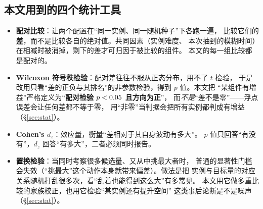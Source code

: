 \documentclass[UTF8, a4paper, 11pt]{ctexart}
\begin{document}
\subsection{本文用到的四个统计工具}
\begin{itemize}\itemsep2pt
  \item \textbf{配对比较}：让两个配置在“同一实例、同一随机种子”下各跑一遍，
        比较它们的\textbf{差}，而不是比较各自的绝对值。共同因素（实例难度、
        本次抽到的模糊时间）在相减时被消掉，剩下的差才可归因于被比较的组件。
        本文的每一组比较都是配对的。
  \item \textbf{Wilcoxon 符号秩检验}：配对差往往不服从正态分布，用不了 $t$ 检验，
        于是改用只看“差的正负与其排名”的非参数检验，得到 $p$ 值。本文把
        “某组件有增益”严格定义为“\textbf{配对检验 $p<0.05$ 且方向为正}”，
        而\emph{不是}“差不是零”——浮点误差会让任何差都不等于零，
        用“非零”当判据会把所有实例都判成有增益（\S\ref{sec:stat}）。
  \item \textbf{Cohen's $d_z$}：效应量，衡量“差相对于其自身波动有多大”。
        $p$ 值只回答“有没有”，$d_z$ 回答“有多大”，二者必须同时报告。
  \item \textbf{置换检验}：当同时考察很多候选量、又从中挑最大者时，
        普通的显著性门槛会失效（“挑最大”这个动作本身就带来偏差）。做法是把
        实例与目标量的对应关系随机打乱很多次，看“乱着也能得到这么大”有多常见。
        本文用它做多重比较的家族校正，也用它检验“某实例还有提升空间”
        这类事后论断是不是噪声（\S\ref{sec:stat}）。
\end{itemize}
\end{document}
